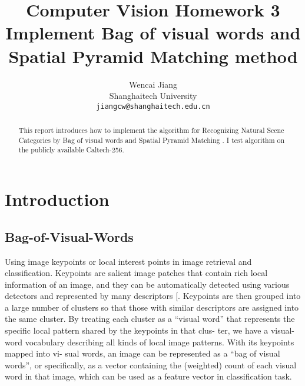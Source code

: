 \documentclass[10pt,twocolumn,letterpaper]{article}
\begin{document}
\title{Computer Vision Homework 3\\Implement Bag of visual words  and Spatial Pyramid Matching  method}

\author{Wencai Jiang\\
Shanghaitech University\\
{\tt\small jiangcw@shanghaitech.edu.cn}
}

\maketitle

\begin{abstract}
   This report introduces how to implement the algorithm for Recognizing Natural Scene Categories by Bag of visual words\cite{YANG2007Evaluating} and Spatial Pyramid Matching \cite{lazebnik2006beyond}. I test algorithm on the publicly available Caltech-256\cite{griffinHolubPerona}.
\end{abstract}

\section{Introduction}
\subsection{Bag-of-Visual-Words}
Using image keypoints or local interest points in image retrieval and classification. Keypoints are salient image patches that contain rich local information of an image, and they can be automatically detected using various detectors  and represented by many descriptors [. Keypoints are then grouped into a large number of clusters so that those with similar descriptors are assigned into the same cluster. By treating each cluster as a “visual word” that represents the specific local pattern shared by the keypoints in that clus- ter, we have a visual-word vocabulary describing all kinds of local image patterns. With its keypoints mapped into vi- sual words, an image can be represented as a “bag of visual words”, or specifically, as a vector containing the (weighted) count of each visual word in that image, which can be used as a feature vector in classification task.
\end{document}

